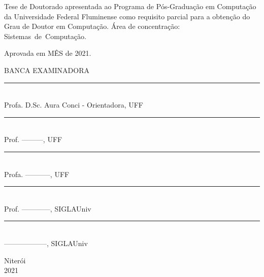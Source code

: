\noindent
\begin{flushright}
\begin{minipage}[t]{8cm}

Tese de Doutorado apresentada ao Programa de Pós-Graduação em Computação da Universidade Federal Fluminense como requisito parcial para a obtenção do \mbox{Grau} de Doutor em Computação. Área de concentração: \mbox{Sistemas de Computação.} %
\end{minipage}
\end{flushright}
\vspace{1.0 cm}
\noindent
Aprovada em MÊS de 2021. \\
\begin{flushright}
  \parbox{10cm}
  {
  \begin{center}
  BANCA EXAMINADORA \\
  \vspace{6mm}
  \rule{11cm}{.1mm} \\
    Profa. D.Sc. Aura Conci - Orientadora, UFF \\
    \vspace{6mm}
  \rule{11cm}{.1mm} \\
     Prof. ---------, UFF \\
   \vspace{6mm}

  \rule{11cm}{.1mm} \\
    Profa. -----------, UFF\\
    \vspace{4mm}
  \rule{11cm}{.1mm} \\
    Prof. ------------, SIGLAUniv\\
  \vspace{4mm}
  \rule{11cm}{.1mm} \\
   ------------------, SIGLAUniv \\
  \end{center}
  }
\end{flushright}
\begin{center}
  Niterói \\
  2021

\end{center}

\cleardoublepage
\thispagestyle{empty}
\vspace*{200mm}

